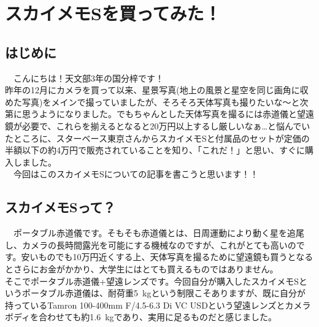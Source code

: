 \chapter{スカイメモSを買ってみた！}

\section{はじめに}
　こんにちは！天文部3年の国分梓です！\\

昨年の12月にカメラを買って以来、星景写真(地上の風景と星空を同じ画角に収めた写真)をメインで撮っていましたが、そろそろ天体写真も撮りたいな～と次第に思うようになりました。でもちゃんとした天体写真を撮るには赤道儀と望遠鏡が必要で、これらを揃えるとなると20万円以上するし厳しいなぁ\dots と悩んでいたところに、スターベース東京さんからスカイメモSと付属品のセットが定価の半額以下の約4万円で販売されていることを知り、「これだ！」と思い、すぐに購入しました。\\
　今回はこのスカイメモSについての記事を書こうと思います！！



\section{スカイメモSって？}
　ポータブル赤道儀です。そもそも赤道儀とは、日周運動により動く星を追尾し、カメラの長時間露光を可能にする機械なのですが、これがとても高いのです。安いものでも10万円近くする上、天体写真を撮るために望遠鏡も買うとなるとさらにお金がかかり、大学生にはとても買えるものではありません。\\

そこでポータブル赤道儀+望遠レンズです。今回自分が購入したスカイメモSというポータブル赤道儀は、耐荷重\SI{5}{kg}という制限こそありますが、既に自分が持っているTamron 100-400mm F/4.5-6.3 Di VC USDという望遠レンズとカメラボディを合わせても約\SI{1.6}{kg}であり、実用に足るものだと感じました。

